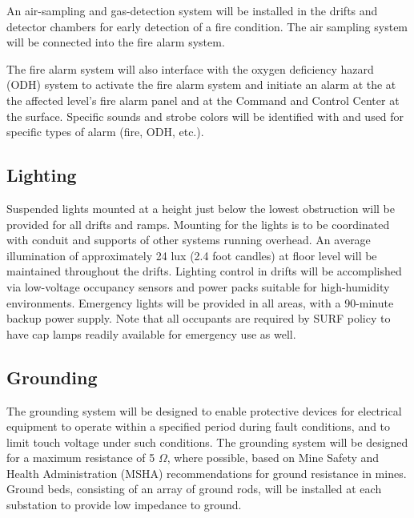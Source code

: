 An air-sampling and gas-detection system will be installed in the drifts and detector chambers for early detection of a fire condition. The air sampling system will be connected into the fire alarm system.

The fire alarm system will also interface with the oxygen deficiency hazard (ODH) system to activate the fire alarm system and initiate an alarm at the at the affected level’s fire alarm panel and at the Command and Control Center at the surface. Specific sounds and strobe colors will be identified with and
used for specific types of alarm (fire, ODH, etc.).

\subsection{Lighting}
\label{sec:fscf-und-light}

Suspended lights mounted at a height just below the lowest obstruction will be provided for all drifts and ramps. Mounting for the lights is to be coordinated with conduit and supports of other systems running overhead. An average illumination of approximately 24 lux (2.4 foot candles) at floor level will be maintained throughout the drifts. Lighting control in drifts will be accomplished via low-voltage occupancy sensors and power packs suitable for high-humidity environments.  Emergency lights will be provided in all areas, with a 90-minute backup power supply.  Note that all occupants are required by SURF policy to have cap lamps readily available for emergency use as well.


\subsection{Grounding}
\label{sec:fscf-und-grounding}

The grounding system will be designed to 
enable protective devices for electrical equipment to operate within a specified period during fault conditions, and to limit touch voltage under such conditions.  The grounding system will be designed for a maximum resistance of 5 $\Omega$, where possible, based on Mine Safety and Health Administration (MSHA) recommendations for ground resistance in mines.  Ground beds, consisting of an array of ground rods, will be installed at each substation %
to provide low impedance to ground.

